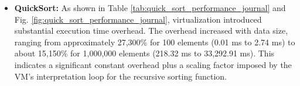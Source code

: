 \begin{itemize}
	\item \textbf{QuickSort:} As shown in Table \ref{tab:quick_sort_performance_journal} and Fig. \ref{fig:quick_sort_performance_journal}, virtualization introduced substantial execution time overhead. The overhead increased with data size, ranging from approximately 27,300\% for 100 elements (0.01 ms to 2.74 ms) to about 15,150\% for 1,000,000 elements (218.32 ms to 33,292.91 ms). This indicates a significant constant overhead plus a scaling factor imposed by the VM's interpretation loop for the recursive sorting function.
	      \begin{table}[!t]
		      \centering
		      \caption{Quick Sort Execution Time Results (ms)}
		      \label{tab:quick_sort_performance_journal}
\end{table}
\end{itemize}
